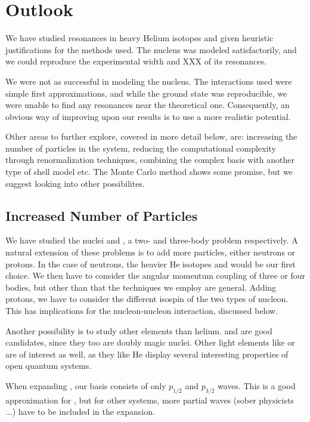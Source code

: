 \documentclass[../main/report.tex]{subfiles}
\begin{document}
\chapter{Outlook}
\label{cha:outlook}

We have studied resonances in heavy Helium isotopes and given heuristic justifications for the methods used. The  nucleus was modeled satisfactorily, and we could reproduce the experimental width and XXX of its resonances. 

We were not as successful in modeling the  nucleus. The interactions used were simple first approximations, and while the ground state was reproducible, we were unable to find any resonances near the theoretical one. Consequently, an obvious way of improving upon our results is to use a more realistic potential.

Other areas to further explore, covered in more detail below, are: increasing the number of particles in the system, reducing the computational complexity through renormalization techniques, combining the complex basis with another type of shell model etc.
The Monte Carlo method shows some promise, but we suggest looking into other possibilites.

\section{Increased Number of Particles}

We have studied the nuclei  and , a two- and three-body problem respectively. 
A natural extension of these problems is to add more particles, either neutrons or protons.
In the case of neutrons, the heavier He isotopes  and  would be our first choice.
We then have to consider the angular momentum coupling of three or four bodies, but other than that the techniques we employ are general.
Adding protons, we have to consider the different isospin of the two types of nucleon.
This has implications for the nucleon-nucleon interaction, discussed below.

Another possibility is to study other elements than helium.  and  are good candidates, since they too are doubly magic nuclei.
Other light elements like  or  are of interest as well, as they like He display several interesting properties of open quantum systems.

When expanding , our basis consists of only $p_{1/2}$ and $p_{3/2}$ waves. 
This is a good approximation for  \cite{gamow_shell_model_2008},  but for other systems, more partial waves (sober physicists ...) have to be included in the expansion.
\end{document}
